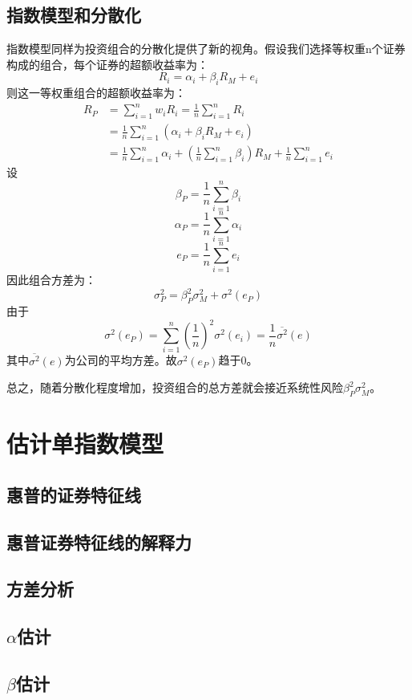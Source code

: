 \documentclass{article}
\begin{document}
\subsection{指数模型和分散化}
指数模型同样为投资组合的分散化提供了新的视角。假设我们选择等权重n个证券构成的组合，每个证券的超额收益率为：
\[
R_i=\alpha_i+\beta_iR_M+e_i
\]
则这一等权重组合的超额收益率为：
\begin{equation*}
	\begin{split}
	R_P&=\sum_{i=1}^{n}w_iR_i=\frac{1}{n}\sum_{i=1}^{n}R_i\\
	&=\frac{1}{n}\sum_{i=1}^{n}(\alpha_i+\beta_iR_M+e_i)\\
	&=\frac{1}{n}\sum_{i=1}^{n}\alpha_i+(\frac{1}{n}\sum_{i=1}^{n}\beta_i)R_M+\frac{1}{n}\sum_{i=1}^{n}e_i
	\end{split}
\end{equation*}
设
\[
\beta_P=\frac{1}{n}\sum_{i=1}^{n}\beta_i
\]
\[
\alpha_P=\frac{1}{n}\sum_{i=1}^{n}\alpha_i
\]
\[
e_P=\frac{1}{n}\sum_{i=1}^{n}e_i
\]
因此组合方差为：
\[
\sigma_P^2=\beta_P^2\sigma_M^2+\sigma^2(e_P)
\]
由于
\[
\sigma^2(e_P)=\sum_{i=1}^{n}(\frac{1}{n})^2\sigma^2(e_i)=\frac{1}{n}\overline{\sigma^2}(e)
\]
其中$ \overline{\sigma^2}(e) $为公司的平均方差。故$ \sigma^2(e_P) $趋于0。

总之，随着分散化程度增加，投资组合的总方差就会接近系统性风险$ \beta_P^2\sigma_M^2 $。

\section{估计单指数模型}
\subsection{惠普的证券特征线}

\subsection{惠普证券特征线的解释力}

\subsection{方差分析}

\subsection{$ \alpha $估计}

\subsection{$ \beta $估计}
\end{document}
